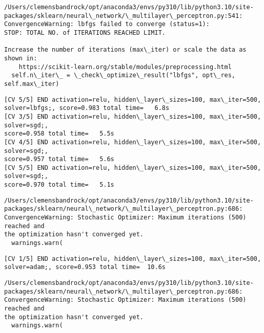 \documentclass[11pt]{article}
\begin{document}
    \begin{Verbatim}[commandchars=\\\{\}]
/Users/clemensbandrock/opt/anaconda3/envs/py310/lib/python3.10/site-
packages/sklearn/neural\_network/\_multilayer\_perceptron.py:541:
ConvergenceWarning: lbfgs failed to converge (status=1):
STOP: TOTAL NO. of ITERATIONS REACHED LIMIT.

Increase the number of iterations (max\_iter) or scale the data as shown in:
    https://scikit-learn.org/stable/modules/preprocessing.html
  self.n\_iter\_ = \_check\_optimize\_result("lbfgs", opt\_res, self.max\_iter)
    \end{Verbatim}

    \begin{Verbatim}[commandchars=\\\{\}]
[CV 5/5] END activation=relu, hidden\_layer\_sizes=100, max\_iter=500,
solver=lbfgs;, score=0.983 total time=   6.8s
[CV 3/5] END activation=relu, hidden\_layer\_sizes=100, max\_iter=500, solver=sgd;,
score=0.958 total time=   5.5s
[CV 4/5] END activation=relu, hidden\_layer\_sizes=100, max\_iter=500, solver=sgd;,
score=0.957 total time=   5.6s
[CV 5/5] END activation=relu, hidden\_layer\_sizes=100, max\_iter=500, solver=sgd;,
score=0.970 total time=   5.1s
    \end{Verbatim}

    \begin{Verbatim}[commandchars=\\\{\}]
/Users/clemensbandrock/opt/anaconda3/envs/py310/lib/python3.10/site-
packages/sklearn/neural\_network/\_multilayer\_perceptron.py:686:
ConvergenceWarning: Stochastic Optimizer: Maximum iterations (500) reached and
the optimization hasn't converged yet.
  warnings.warn(
    \end{Verbatim}

    \begin{Verbatim}[commandchars=\\\{\}]
[CV 1/5] END activation=relu, hidden\_layer\_sizes=100, max\_iter=500,
solver=adam;, score=0.953 total time=  10.6s
    \end{Verbatim}

    \begin{Verbatim}[commandchars=\\\{\}]
/Users/clemensbandrock/opt/anaconda3/envs/py310/lib/python3.10/site-
packages/sklearn/neural\_network/\_multilayer\_perceptron.py:686:
ConvergenceWarning: Stochastic Optimizer: Maximum iterations (500) reached and
the optimization hasn't converged yet.
  warnings.warn(
    \end{Verbatim}
\end{document}
